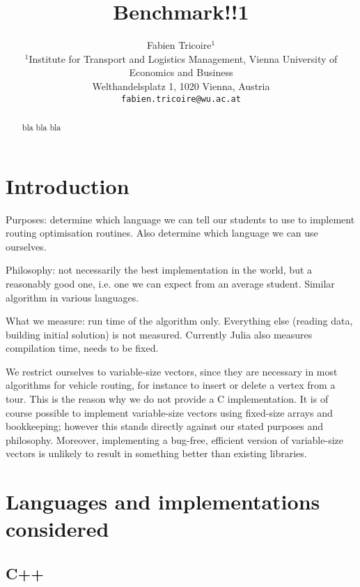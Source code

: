 \documentclass[11pt,a4paper,notitlepage]{article}
\begin{document}
\title{Benchmark!!1}
\author{
Fabien Tricoire$^{1}$ \\[1ex]
 \small $^1$Institute for Transport and Logistics Management,
 Vienna University of Economics and Business\\
 \small Welthandelsplatz 1, 1020 Vienna, Austria\\
  \small \texttt{fabien.tricoire@wu.ac.at}\\[2ex]
}
\date{}
\maketitle

\begin{abstract}
  bla bla bla
\end{abstract}

\section{Introduction}
\label{sec:intro}
Purposes: determine which language we can tell our students to
use to implement routing optimisation routines. Also determine which
language we can use ourselves.

Philosophy: not necessarily the best
implementation in the world, but a reasonably good one, i.e. one we
can expect from an average student. Similar algorithm in various languages.

What we measure: run time of the algorithm only. Everything else
(reading data, building initial solution) is not measured. Currently
Julia also measures compilation time, needs to be fixed.

We restrict ourselves to variable-size vectors, since they are
necessary in most algorithms for vehicle routing, for instance to
insert or delete a vertex from a tour. This is the reason why we do
not provide a C implementation. It is of course possible to
implement variable-size vectors using fixed-size arrays and
bookkeeping; however this stands directly against our stated purposes
and philosophy. Moreover, implementing a bug-free, efficient version
of variable-size vectors is unlikely to result in something better
than existing libraries.

\section{Languages and implementations considered}
\subsection{C++}
\end{document}
